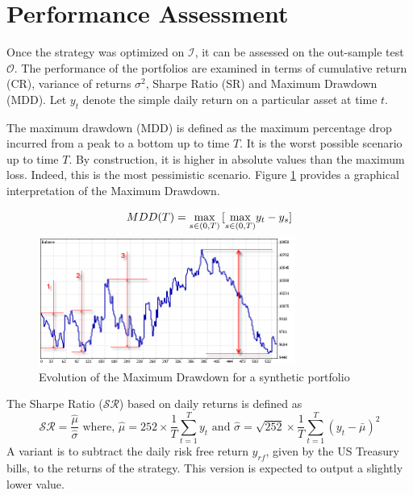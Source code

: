 \documentclass[11pt,a4,twosided,singlespacing,titlepagenumber=on]{scrreprt}
\numberwithin{equation}{chapter} %
\theoremstyle{remark}
\begin{document}
\section{Performance Assessment}
Once the strategy was optimized on $\mathcal{I}$, it can be assessed on the out-sample test $\mathcal{O}$. The performance of the portfolios are examined in terms of cumulative return (CR), variance of returns $\sigma^2$, Sharpe Ratio (SR) and Maximum Drawdown (MDD). Let $y_t$ denote the simple daily return on a particular asset at time $t$. 

The maximum drawdown (MDD) is defined as the maximum percentage drop incurred from a peak to a bottom up to time $T$. It is the worst possible scenario up to time $T$. By construction, it is higher in absolute values than the maximum loss. Indeed, this is the most pessimistic scenario. Figure \ref{mdd} provides a graphical interpretation of the Maximum Drawdown.

\begin{equation}
MDD(T) = \smash{\displaystyle\max_{s \in (0,T)}} \left[\smash{\displaystyle\max_{s \in (0,T)}} y_t - y_s \right] 
\end{equation}

\begin{figure}[H]
\centering
\includegraphics[width = 0.75\textwidth]{mdd}
\caption{Evolution of the Maximum Drawdown for a synthetic portfolio}
\label{mdd}
\end{figure}

The Sharpe Ratio ($\mathcal{SR}$) based on daily returns is defined as
\begin{equation}
\mathcal{SR} =  \frac{\hat{\mu}}{\hat{\sigma}} \text{ where, } \hat{\mu} =  252  \times \frac{1}{T} \sum_{t=1}^T y_t \text{ and } \hat{\sigma} = \sqrt{252} \times \frac{1}{T} \sum_{t=1}^T (y_t - \bar{\mu})^2 \label{sharpe_ratio_def}
\end{equation}
A variant is to subtract the daily risk free return $y_{rf}$, given by the US Treasury bills, to the returns of the strategy. This version is expected to output a slightly lower value. \\
\end{document}
